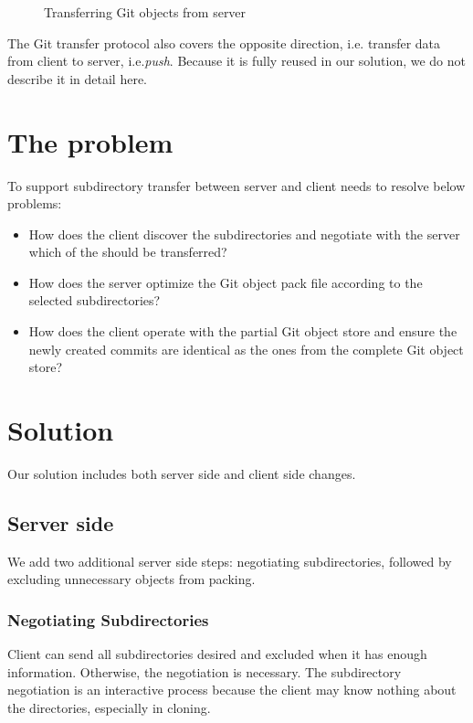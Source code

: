 \documentclass[copyrightwanted=false]{sigplanconf}
\begin{document}
\begin{figure}[htpb]
  \centering
  
  \caption{Transferring Git objects from server}
  \label{fig:git-proto-clone-seq}
\end{figure}
The Git transfer protocol also covers the opposite direction, i.e. transfer
data from client to server, i.e.\emph{push}.
Because it is fully reused in our solution, we do not describe it in detail
here.

\section{The problem}
To support subdirectory transfer between server and client needs to
resolve below problems:
\begin{itemize}
  \item How does the client discover the subdirectories and negotiate with
      the server which of the should be transferred?

  \item How does the server optimize the Git object pack file according to the
      selected subdirectories?

  \item How does the client operate with the partial Git object store and
      ensure the newly created commits are identical as the ones
      from the complete Git object store?
\end{itemize}

\section{Solution}
Our solution includes both server side and client side changes.
\subsection{Server side}
We add two additional server side steps: negotiating subdirectories,
followed by excluding unnecessary objects from packing.
\subsubsection{Negotiating Subdirectories}
Client can send all subdirectories desired and excluded when it has enough
information.
Otherwise, the negotiation is necessary.
The subdirectory negotiation is an interactive process because the client may
know nothing about the directories, especially in cloning.
\end{document}
